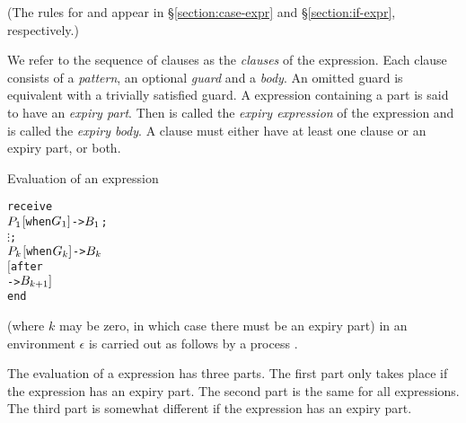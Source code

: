 \SYNTAX

\begin{rules}
       { \NT{\CrtClauses}  \OR
         \OPT{\CrtClauses}    }
\end{rules}
(The rules for \NT{\CrtClauses} and  appear
in \S\ref{section:case-expr} and \S\ref{section:if-expr}, respectively.)

We refer to the sequence of clauses as the \emph{clauses} of the
 expression.  Each clause consists of a \emph{pattern}, an optional
\emph{guard} and a \emph{body}.
An omitted guard is equivalent with a trivially satisfied  guard.
A  expression containing
a part  is said to have an \emph{expiry part}.
Then  is called the \emph{expiry expression} of the
 expression and  is called the \emph{expiry body}.
A clause must either have at least one clause or an expiry part, or both.

\EVALUATION

Evaluation of an expression
\begin{alltt}
receive
    \(\Z{P}\sb{1}\) \([\)when \(\Z{G}\sb{1}]\) -> \(\Z{B}\sb{1}\) ;
    \(\vdots\) ;
    \(\Z{P}\sb{k}\) \([\)when \(\Z{G}\sb{k}]\) -> \(\Z{B}\sb{k}\)
\([\)after
     -> \(\Z{B}\sb{k+1}]\)
end
\end{alltt}
(where $k$ may be zero, in which case there must be an expiry part) in
an environment $\epsilon$ is carried out as follows by a process
.

The evaluation of a  expression has three parts.  The first
part only takes place if the  expression has an expiry part.
The second part is the same for all  expressions.
The third part is somewhat different if the  expression
has an expiry part.

